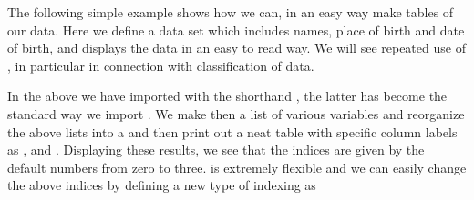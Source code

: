 \documentclass[letterpaper,10pt,english]{sphinxmanual}
\begin{document}
The following simple example shows how we can, in an easy way make tables of our data. Here we define a data set which includes names, place of birth and date of birth, and displays the data in an easy to read way. We will see repeated use of , in particular in connection with classification of data.

\begin{sphinxVerbatim}[commandchars=\\\{\}]
   
   
   \PYG{p}{[}   \PYG{p}{]}
         \PYG{p}{[} \PYG{p}{]}
         \PYG{p}{[}   \PYG{p}{]}
         \PYG{p}{[}   \PYG{p}{]}
  
\end{sphinxVerbatim}

In the above we have imported  with the shorthand , the latter has become the standard way we import . We make then a list of various variables
and reorganize the above lists into a  and then print out  a neat table with specific column labels as ,  and .
Displaying these results, we see that the indices are given by the default numbers from zero to three.
 is extremely flexible and we can easily change the above indices by defining a new type of indexing as
\end{document}
